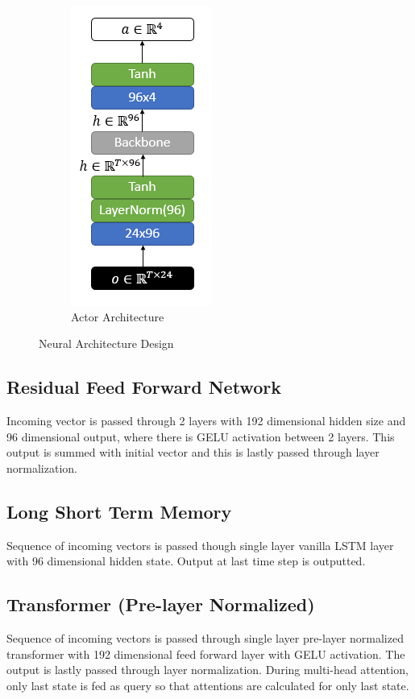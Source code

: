 \begin{figure}
\begin{subfigure}{.5\textwidth}
		\includegraphics[width=0.55\linewidth]{figures/nets/actor.png}
		\caption{Actor Architecture}
		\label{fig:actor_net}
	\end{subfigure}
	\caption{Neural Architecture Design}
	\label{fig:nets}
\end{figure}

\subsection{Residual Feed Forward Network}

Incoming vector is passed through 2 layers with 192 dimensional hidden size and 96 dimensional output, where there is GELU activation between 2 layers. 
This output is summed with initial vector and this is lastly passed through layer normalization. 

\subsection{Long Short Term Memory}

Sequence of incoming vectors is passed though single layer vanilla LSTM layer with 96 dimensional hidden state. 
Output at last time step is outputted. 

\subsection{Transformer (Pre-layer Normalized)}

Sequence of incoming vectors is passed through single layer pre-layer normalized transformer with 192 dimensional feed forward layer with GELU activation. 
The output is lastly passed through layer normalization. 
During multi-head attention, only last state is fed as query so that attentions are calculated for only last state. 

